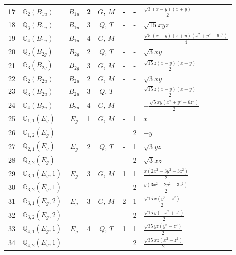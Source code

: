\documentclass[fleqn,10pt,landscape]{jsarticle}
\begin{document}
\begin{longtable}[l]{clcccccl}
17 & $\mathbb{G}_{2}(B_{1u})$ & $B_{1u}$ & 2 & $G$, $M$ & - & - & $\frac{\sqrt{3} \left(x - y\right) \left(x + y\right)}{2}$ \\ \hline
18 & $\mathbb{Q}_{3}(B_{1u})$ & $B_{1u}$ & 3 & $Q$, $T$ & - & - & $\sqrt{15} x y z$ \\ \hline
19 & $\mathbb{G}_{4}(B_{1u})$ & $B_{1u}$ & 4 & $G$, $M$ & - & - & $\frac{\sqrt{5} \left(x - y\right) \left(x + y\right) \left(x^{2} + y^{2} - 6 z^{2}\right)}{4}$ \\ \hline
20 & $\mathbb{Q}_{2}(B_{2g})$ & $B_{2g}$ & 2 & $Q$, $T$ & - & - & $\sqrt{3} x y$ \\ \hline
21 & $\mathbb{G}_{3}(B_{2g})$ & $B_{2g}$ & 3 & $G$, $M$ & - & - & $\frac{\sqrt{15} z \left(x - y\right) \left(x + y\right)}{2}$ \\ \hline
22 & $\mathbb{G}_{2}(B_{2u})$ & $B_{2u}$ & 2 & $G$, $M$ & - & - & $\sqrt{3} x y$ \\ \hline
23 & $\mathbb{Q}_{3}(B_{2u})$ & $B_{2u}$ & 3 & $Q$, $T$ & - & - & $\frac{\sqrt{15} z \left(x - y\right) \left(x + y\right)}{2}$ \\ \hline
24 & $\mathbb{G}_{4}(B_{2u})$ & $B_{2u}$ & 4 & $G$, $M$ & - & - & $- \frac{\sqrt{5} x y \left(x^{2} + y^{2} - 6 z^{2}\right)}{2}$ \\ \hline
25 & $\mathbb{G}_{1,1}(E_{g})$ & $E_{g}$ & 1 & $G$, $M$ & - & 1 & $x$ \\
26 & $\mathbb{G}_{1,2}(E_{g})$ &  &  &  &  & 2 & $- y$ \\ \hline
27 & $\mathbb{Q}_{2,1}(E_{g})$ & $E_{g}$ & 2 & $Q$, $T$ & - & 1 & $\sqrt{3} y z$ \\
28 & $\mathbb{Q}_{2,2}(E_{g})$ &  &  &  &  & 2 & $\sqrt{3} x z$ \\ \hline
29 & $\mathbb{G}_{3,1}(E_{g},1)$ & $E_{g}$ & 3 & $G$, $M$ & 1 & 1 & $\frac{x \left(2 x^{2} - 3 y^{2} - 3 z^{2}\right)}{2}$ \\
30 & $\mathbb{G}_{3,2}(E_{g},1)$ &  &  &  &  & 2 & $\frac{y \left(3 x^{2} - 2 y^{2} + 3 z^{2}\right)}{2}$ \\ \hline
31 & $\mathbb{G}_{3,1}(E_{g},2)$ & $E_{g}$ & 3 & $G$, $M$ & 2 & 1 & $\frac{\sqrt{15} x \left(y^{2} - z^{2}\right)}{2}$ \\
32 & $\mathbb{G}_{3,2}(E_{g},2)$ &  &  &  &  & 2 & $\frac{\sqrt{15} y \left(- x^{2} + z^{2}\right)}{2}$ \\ \hline
33 & $\mathbb{Q}_{4,1}(E_{g},1)$ & $E_{g}$ & 4 & $Q$, $T$ & 1 & 1 & $\frac{\sqrt{35} y z \left(y^{2} - z^{2}\right)}{2}$ \\
34 & $\mathbb{Q}_{4,2}(E_{g},1)$ &  &  &  &  & 2 & $\frac{\sqrt{35} x z \left(x^{2} - z^{2}\right)}{2}$ \\ \hline

\end{longtable}
\end{document}
